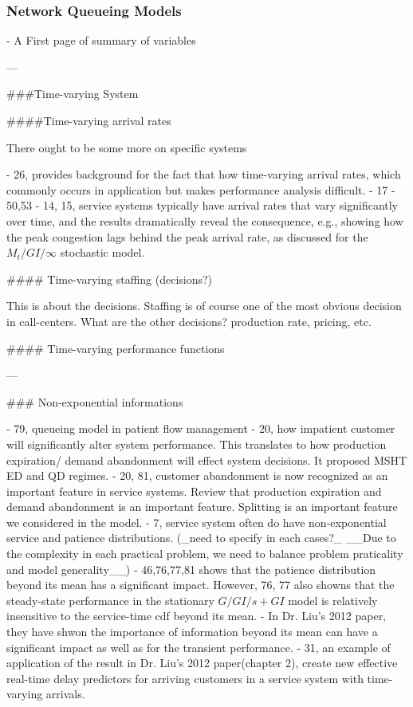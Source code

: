 \subsubsection{Network Queueing Models}
\begin{markdown}
- A First page of summary of variables

---

###Time-varying System

####Time-varying arrival rates

There ought to be some more on specific systems

- 26, provides background for the fact that how time-varying arrival rates, which commonly occurs in application but makes performance analysis difficult.
- 17
- 50,53
- 14, 15, service systems typically have arrival rates that vary significantly over time, and the results dramatically reveal the consequence, e.g., showing how the peak congestion lags behind the peak arrival rate, as discussed for the $M_t/GI/\infty$ stochastic model.



#### Time-varying staffing (decisions?)

This is about the decisions. Staffing is of course one of the most obvious decision in call-centers. What are the other decisions? production rate, pricing, etc.

#### Time-varying performance functions



---

### Non-exponential informations

- 79, queueing model in patient flow management 
- 20, how impatient customer will significantly alter system performance. This translates to how production expiration/ demand abandonment will effect system decisions. It proposed MSHT ED and QD regimes.
- 20, 81, customer abandonment is now recognized as an important feature in service systems. Review that production expiration and demand abandonment is an important feature. Splitting is an important feature we considered in the model. 
- 7, service system often do have non-exponential service and patience distributions. (_need to specify in each cases?_ __Due to the complexity in each practical problem, we need to balance problem praticality and model generality__)  
- 46,76,77,81 shows that the patience distribution beyond its mean has a significant impact. However, 76, 77 also showns that the steady-state performance in the stationary $G/GI/s+GI$ model is relatively insensitive to the service-time cdf beyond its mean.
- In Dr. Liu's 2012 paper, they have shwon the importance of information beyond its mean can have a significant impact as well as for the transient performance. 
- 31, an example of application of the result in Dr. Liu's 2012 paper(chapter 2), create new effective real-time delay predictors for arriving customers in a service system with time-varying arrivals.


\end{markdown}
